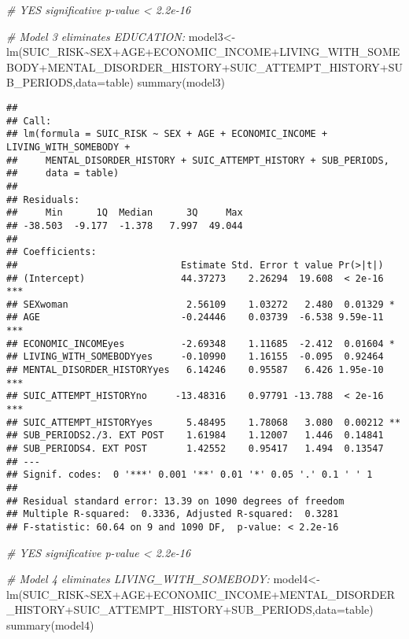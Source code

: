 \documentclass[
]{book}
\newenvironment{Shaded}{\begin{snugshade}}{\end{snugshade}}
\newcommand{\AttributeTok}[1]{\textcolor[rgb]{0.77,0.63,0.00}{#1}}
\newcommand{\CommentTok}[1]{\textcolor[rgb]{0.56,0.35,0.01}{\textit{#1}}}
\newcommand{\FunctionTok}[1]{\textcolor[rgb]{0.00,0.00,0.00}{#1}}
\newcommand{\NormalTok}[1]{#1}
\newcommand{\OtherTok}[1]{\textcolor[rgb]{0.56,0.35,0.01}{#1}}
\newcommand{\SpecialCharTok}[1]{\textcolor[rgb]{0.00,0.00,0.00}{#1}}
\begin{document}
\begin{Shaded}
\begin{Highlighting}[]
\CommentTok{\# YES significative p{-}value \textless{} 2.2e{-}16}

\CommentTok{\# Model 3 eliminates EDUCATION:}
\NormalTok{model3}\OtherTok{\textless{}{-}}\FunctionTok{lm}\NormalTok{(SUIC\_RISK}\SpecialCharTok{\textasciitilde{}}\NormalTok{SEX}\SpecialCharTok{+}\NormalTok{AGE}\SpecialCharTok{+}\NormalTok{ECONOMIC\_INCOME}\SpecialCharTok{+}\NormalTok{LIVING\_WITH\_SOMEBODY}\SpecialCharTok{+}\NormalTok{MENTAL\_DISORDER\_HISTORY}\SpecialCharTok{+}\NormalTok{SUIC\_ATTEMPT\_HISTORY}\SpecialCharTok{+}\NormalTok{SUB\_PERIODS,}\AttributeTok{data=}\NormalTok{table)}
\FunctionTok{summary}\NormalTok{(model3)}
\end{Highlighting}
\end{Shaded}

\begin{verbatim}
## 
## Call:
## lm(formula = SUIC_RISK ~ SEX + AGE + ECONOMIC_INCOME + LIVING_WITH_SOMEBODY + 
##     MENTAL_DISORDER_HISTORY + SUIC_ATTEMPT_HISTORY + SUB_PERIODS, 
##     data = table)
## 
## Residuals:
##     Min      1Q  Median      3Q     Max 
## -38.503  -9.177  -1.378   7.997  49.044 
## 
## Coefficients:
##                             Estimate Std. Error t value Pr(>|t|)    
## (Intercept)                 44.37273    2.26294  19.608  < 2e-16 ***
## SEXwoman                     2.56109    1.03272   2.480  0.01329 *  
## AGE                         -0.24446    0.03739  -6.538 9.59e-11 ***
## ECONOMIC_INCOMEyes          -2.69348    1.11685  -2.412  0.01604 *  
## LIVING_WITH_SOMEBODYyes     -0.10990    1.16155  -0.095  0.92464    
## MENTAL_DISORDER_HISTORYyes   6.14246    0.95587   6.426 1.95e-10 ***
## SUIC_ATTEMPT_HISTORYno     -13.48316    0.97791 -13.788  < 2e-16 ***
## SUIC_ATTEMPT_HISTORYyes      5.48495    1.78068   3.080  0.00212 ** 
## SUB_PERIODS2./3. EXT POST    1.61984    1.12007   1.446  0.14841    
## SUB_PERIODS4. EXT POST       1.42552    0.95417   1.494  0.13547    
## ---
## Signif. codes:  0 '***' 0.001 '**' 0.01 '*' 0.05 '.' 0.1 ' ' 1
## 
## Residual standard error: 13.39 on 1090 degrees of freedom
## Multiple R-squared:  0.3336, Adjusted R-squared:  0.3281 
## F-statistic: 60.64 on 9 and 1090 DF,  p-value: < 2.2e-16
\end{verbatim}

\begin{Shaded}
\begin{Highlighting}[]
\CommentTok{\# YES significative p{-}value \textless{} 2.2e{-}16}

\CommentTok{\# Model 4 eliminates LIVING\_WITH\_SOMEBODY:}
\NormalTok{model4}\OtherTok{\textless{}{-}}\FunctionTok{lm}\NormalTok{(SUIC\_RISK}\SpecialCharTok{\textasciitilde{}}\NormalTok{SEX}\SpecialCharTok{+}\NormalTok{AGE}\SpecialCharTok{+}\NormalTok{ECONOMIC\_INCOME}\SpecialCharTok{+}\NormalTok{MENTAL\_DISORDER\_HISTORY}\SpecialCharTok{+}\NormalTok{SUIC\_ATTEMPT\_HISTORY}\SpecialCharTok{+}\NormalTok{SUB\_PERIODS,}\AttributeTok{data=}\NormalTok{table)}
\FunctionTok{summary}\NormalTok{(model4)}
\end{Highlighting}
\end{Shaded}
\end{document}
